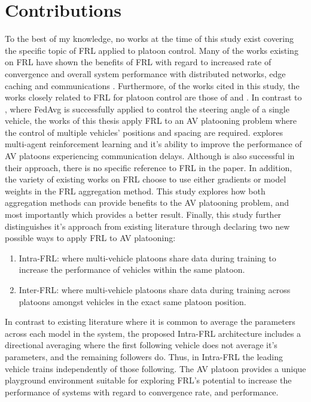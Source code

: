 \section{Contributions}
To the best of my knowledge, no works at the time of this study exist covering the
specific topic of FRL applied to platoon control. Many of the works existing on FRL
have shown the benefits of FRL with regard to increased rate of convergence and overall
system performance with distributed networks, edge caching and communications
\cite{ZhangX2020, LimHyun2021, WangXiaofei2021, Huang2021}.  Furthermore, of the works
cited in this study, the works closely related to FRL for platoon control are those of
\cite{Peake2020} and \cite{Liang2019}.  In contrast to \cite{Liang2019}, where FedAvg
is successfully applied to control the steering angle of a single vehicle,
the works of this thesis apply FRL to an AV platooning problem where the control of multiple vehicles' positions and
spacing are required.  \cite{Peake2020} explores multi-agent reinforcement learning
and it's ability to improve the performance of AV platoons experiencing communication delays.
Although \cite{Peake2020} is also successful in their approach, there is no specific
reference to FRL in the paper. In addition, the variety of existing works on FRL
choose to use either gradients or model weights in the FRL aggregation method.
This study explores how both aggregation methods can provide benefits to the AV
platooning problem, and most importantly which provides a better result. Finally, this
study further distinguishes it's approach from existing literature through declaring two
new possible ways to apply FRL to AV platooning:

\begin{enumerate}
    \item Intra-FRL: where multi-vehicle platoons share data during training to increase
    the performance of vehicles within the same platoon.
    \item Inter-FRL: where multi-vehicle platoons share data during training across
    platoons amongst vehicles in the exact same platoon position.
\end{enumerate}

In contrast to existing literature where it is common to average the parameters
across each model in the system, the proposed Intra-FRL architecture includes
a directional averaging where
the first following vehicle does not average it's parameters, and the remaining
followers do. Thus, in Intra-FRL the leading vehicle trains independently of those
following. The AV platoon provides a unique playground environment suitable for
exploring FRL's potential to increase the performance of systems with regard to
convergence rate, and performance.

